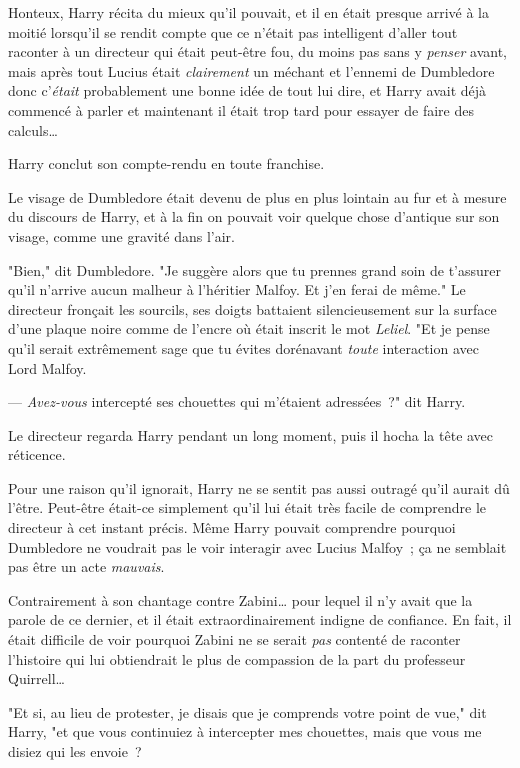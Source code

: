 Honteux, Harry récita du mieux qu'il pouvait, et il en était presque arrivé à la moitié lorsqu'il se rendit compte que ce n'était pas intelligent d'aller tout raconter à un directeur qui était peut-être fou, du moins pas sans y \emph{penser} avant, mais après tout Lucius était \emph{clairement} un méchant et l'ennemi de Dumbledore donc c'\emph{était} probablement une bonne idée de tout lui dire, et Harry avait déjà commencé à parler et maintenant il était trop tard pour essayer de faire des calculs…

Harry conclut son compte-rendu en toute franchise.

Le visage de Dumbledore était devenu de plus en plus lointain au fur et à mesure du discours de Harry, et à la fin on pouvait voir quelque chose d'antique sur son visage, comme une gravité dans l'air.

"Bien," dit Dumbledore. "Je suggère alors que tu prennes grand soin de t'assurer qu'il n'arrive aucun malheur à l'héritier Malfoy. Et j'en ferai de même." Le directeur fronçait les sourcils, ses doigts battaient silencieusement sur la surface d'une plaque noire comme de l'encre où était inscrit le mot \emph{Leliel}. "Et je pense qu'il serait extrêmement sage que tu évites dorénavant \emph{toute} interaction avec Lord Malfoy.

--- \emph{Avez-vous} intercepté ses chouettes qui m'étaient adressées~?" dit Harry.

Le directeur regarda Harry pendant un long moment, puis il hocha la tête avec réticence.

Pour une raison qu'il ignorait, Harry ne se sentit pas aussi outragé qu'il aurait dû l'être. Peut-être était-ce simplement qu'il lui était très facile de comprendre le directeur à cet instant précis. Même Harry pouvait comprendre pourquoi Dumbledore ne voudrait pas le voir interagir avec Lucius Malfoy~; ça ne semblait pas être un acte \emph{mauvais}.

Contrairement à son chantage contre Zabini… pour lequel il n'y avait que la parole de ce dernier, et il était extraordinairement indigne de confiance. En fait, il était difficile de voir pourquoi Zabini ne se serait \emph{pas} contenté de raconter l'histoire qui lui obtiendrait le plus de compassion de la part du professeur Quirrell…

"Et si, au lieu de protester, je disais que je comprends votre point de vue," dit Harry, "et que vous continuiez à intercepter mes chouettes, mais que vous me disiez qui les envoie~?

